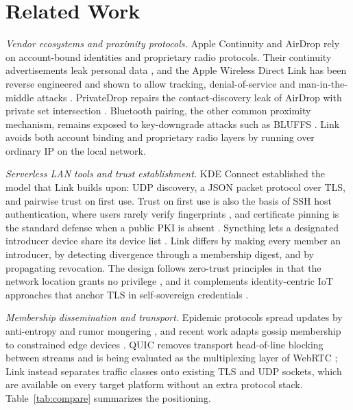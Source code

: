 \documentclass[conference,a4paper]{IEEEtran}
\begin{document}
\section{Related Work}
\label{sec:related}
\textit{Vendor ecosystems and proximity protocols.} Apple Continuity and AirDrop rely on account-bound identities and proprietary radio protocols. Their continuity advertisements leak personal data \cite{celosia2020discontinued}, and the Apple Wireless Direct Link has been reverse engineered and shown to allow tracking, denial-of-service and man-in-the-middle attacks \cite{stute2019billion}. PrivateDrop repairs the contact-discovery leak of AirDrop with private set intersection \cite{heinrich2021privatedrop}. Bluetooth pairing, the other common proximity mechanism, remains exposed to key-downgrade attacks such as BLUFFS \cite{antonioli2023bluffs, casar2022ble}. Link avoids both account binding and proprietary radio layers by running over ordinary IP on the local network.

\textit{Serverless LAN tools and trust establishment.} KDE Connect \cite{kdeconnect} established the model that Link builds upon: UDP discovery, a JSON packet protocol over TLS, and pairwise trust on first use. Trust on first use is also the basis of SSH host authentication, where users rarely verify fingerprints \cite{neef2022ssh}, and certificate pinning is the standard defense when a public PKI is absent \cite{pradeep2022pinning}. Syncthing lets a designated introducer device share its device list \cite{syncthingintroducer}. Link differs by making every member an introducer, by detecting divergence through a membership digest, and by propagating revocation. The design follows zero-trust principles in that the network location grants no privilege \cite{nist80207, nahar2024zerotrust}, and it complements identity-centric IoT approaches that anchor TLS in self-sovereign credentials \cite{perugini2024ssi}.

\textit{Membership dissemination and transport.} Epidemic protocols spread updates by anti-entropy and rumor mongering \cite{demers1987epidemic}, and recent work adapts gossip membership to constrained edge devices \cite{daubaris2026muswim}. QUIC removes transport head-of-line blocking between streams \cite{rfc9000} and is being evaluated as the multiplexing layer of WebRTC \cite{engelbart2026quic}; Link instead separates traffic classes onto existing TLS and UDP sockets, which are available on every target platform without an extra protocol stack. Table~\ref{tab:compare} summarizes the positioning.
\end{document}
